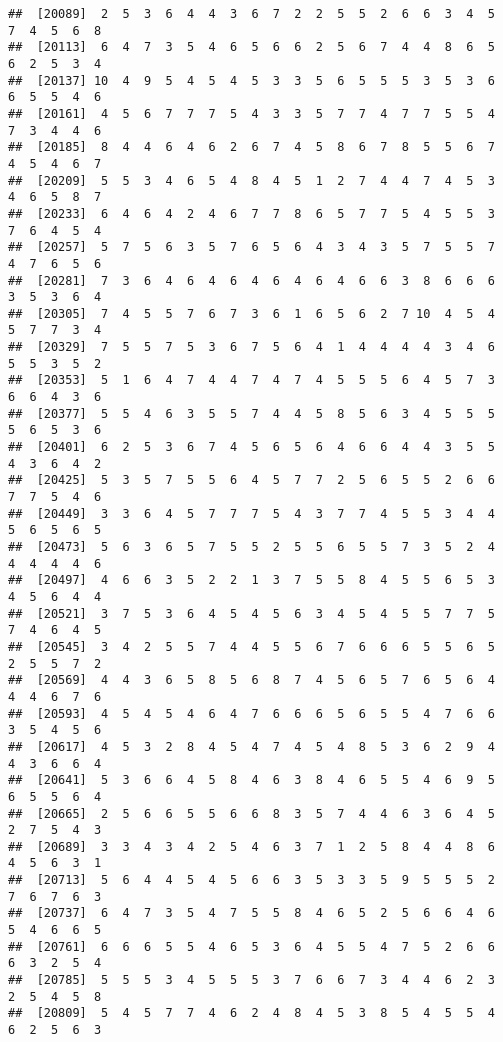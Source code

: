 \documentclass[
]{book}
\begin{document}
\begin{verbatim}
##  [20089]  2  5  3  6  4  4  3  6  7  2  2  5  5  2  6  6  3  4  5  7  4  5  6  8
##  [20113]  6  4  7  3  5  4  6  5  6  6  2  5  6  7  4  4  8  6  5  6  2  5  3  4
##  [20137] 10  4  9  5  4  5  4  5  3  3  5  6  5  5  5  3  5  3  6  6  5  5  4  6
##  [20161]  4  5  6  7  7  7  5  4  3  3  5  7  7  4  7  7  5  5  4  7  3  4  4  6
##  [20185]  8  4  4  6  4  6  2  6  7  4  5  8  6  7  8  5  5  6  7  4  5  4  6  7
##  [20209]  5  5  3  4  6  5  4  8  4  5  1  2  7  4  4  7  4  5  3  4  6  5  8  7
##  [20233]  6  4  6  4  2  4  6  7  7  8  6  5  7  7  5  4  5  5  3  7  6  4  5  4
##  [20257]  5  7  5  6  3  5  7  6  5  6  4  3  4  3  5  7  5  5  7  4  7  6  5  6
##  [20281]  7  3  6  4  6  4  6  4  6  4  6  4  6  6  3  8  6  6  6  3  5  3  6  4
##  [20305]  7  4  5  5  7  6  7  3  6  1  6  5  6  2  7 10  4  5  4  5  7  7  3  4
##  [20329]  7  5  5  7  5  3  6  7  5  6  4  1  4  4  4  4  3  4  6  5  5  3  5  2
##  [20353]  5  1  6  4  7  4  4  7  4  7  4  5  5  5  6  4  5  7  3  6  6  4  3  6
##  [20377]  5  5  4  6  3  5  5  7  4  4  5  8  5  6  3  4  5  5  5  5  6  5  3  6
##  [20401]  6  2  5  3  6  7  4  5  6  5  6  4  6  6  4  4  3  5  5  4  3  6  4  2
##  [20425]  5  3  5  7  5  5  6  4  5  7  7  2  5  6  5  5  2  6  6  7  7  5  4  6
##  [20449]  3  3  6  4  5  7  7  7  5  4  3  7  7  4  5  5  3  4  4  5  6  5  6  5
##  [20473]  5  6  3  6  5  7  5  5  2  5  5  6  5  5  7  3  5  2  4  4  4  4  4  6
##  [20497]  4  6  6  3  5  2  2  1  3  7  5  5  8  4  5  5  6  5  3  4  5  6  4  4
##  [20521]  3  7  5  3  6  4  5  4  5  6  3  4  5  4  5  5  7  7  5  7  4  6  4  5
##  [20545]  3  4  2  5  5  7  4  4  5  5  6  7  6  6  6  5  5  6  5  2  5  5  7  2
##  [20569]  4  4  3  6  5  8  5  6  8  7  4  5  6  5  7  6  5  6  4  4  4  6  7  6
##  [20593]  4  5  4  5  4  6  4  7  6  6  6  5  6  5  5  4  7  6  6  3  5  4  5  6
##  [20617]  4  5  3  2  8  4  5  4  7  4  5  4  8  5  3  6  2  9  4  4  3  6  6  4
##  [20641]  5  3  6  6  4  5  8  4  6  3  8  4  6  5  5  4  6  9  5  6  5  5  6  4
##  [20665]  2  5  6  6  5  5  6  6  8  3  5  7  4  4  6  3  6  4  5  2  7  5  4  3
##  [20689]  3  3  4  3  4  2  5  4  6  3  7  1  2  5  8  4  4  8  6  4  5  6  3  1
##  [20713]  5  6  4  4  5  4  5  6  6  3  5  3  3  5  9  5  5  5  2  7  6  7  6  3
##  [20737]  6  4  7  3  5  4  7  5  5  8  4  6  5  2  5  6  6  4  6  5  4  6  6  5
##  [20761]  6  6  6  5  5  4  6  5  3  6  4  5  5  4  7  5  2  6  6  6  3  2  5  4
##  [20785]  5  5  5  3  4  5  5  5  3  7  6  6  7  3  4  4  6  2  3  2  5  4  5  8
##  [20809]  5  4  5  7  7  4  6  2  4  8  4  5  3  8  5  4  5  5  4  6  2  5  6  3

\end{verbatim}
\end{document}
